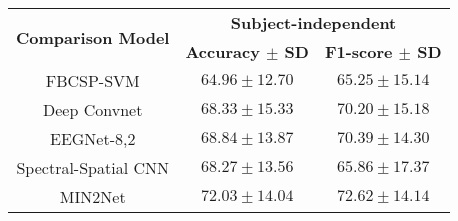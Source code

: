     \begin{tabular}{@{}ccc@{}}
    \toprule
    \multirow{2}{*}{\textbf{Comparison Model}} & \multicolumn{2}{c}{\textbf{Subject-independent}}       \\ \cmidrule(l){2-3} 
                                               & \textbf{Accuracy $\pm$ SD}          & \textbf{F1-score $\pm$ SD}         \\ \midrule
    FBCSP-SVM                                  & $64.96 \pm 12.70$          & $65.25 \pm 15.14$         \\
    Deep Convnet                               & $68.33 \pm 15.33$          & $70.20 \pm 15.18$         \\
    EEGNet-8,2                                 & $68.84 \pm 13.87$          & $70.39 \pm 14.30$         \\
    Spectral-Spatial CNN                       & $68.27 \pm 13.56$          & $65.86 \pm 17.37$         \\
    MIN2Net                                    & $\mathbf{72.03 \pm 14.04}$ & $\mathbf{72.62 \pm 14.14}$ \\ \bottomrule
    \end{tabular}%